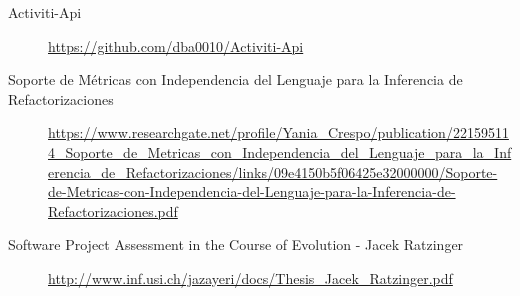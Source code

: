 
\begin{description}
	\item[Activiti-Api] \url{https://github.com/dba0010/Activiti-Api}
	\item[Soporte de Métricas con Independencia del Lenguaje para la Inferencia de Refactorizaciones] \url{https://www.researchgate.net/profile/Yania_Crespo/publication/221595114_Soporte_de_Metricas_con_Independencia_del_Lenguaje_para_la_Inferencia_de_Refactorizaciones/links/09e4150b5f06425e32000000/Soporte-de-Metricas-con-Independencia-del-Lenguaje-para-la-Inferencia-de-Refactorizaciones.pdf}
	\item[Software Project Assessment in the Course of Evolution -  Jacek Ratzinger] \url{http://www.inf.usi.ch/jazayeri/docs/Thesis_Jacek_Ratzinger.pdf}
\end{description}